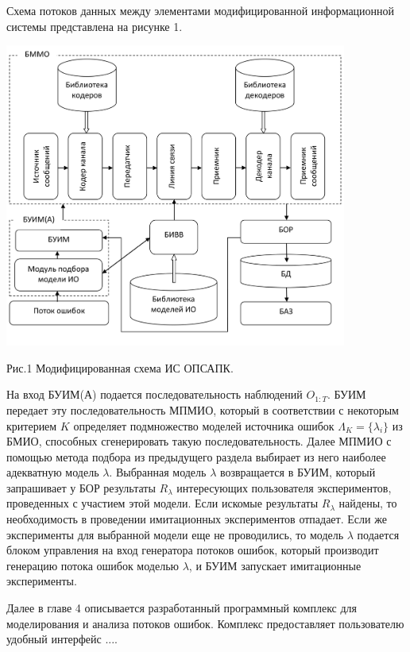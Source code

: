 \documentclass[twoside,12pt]{article}
\begin{document}
Схема потоков данных между элементами модифицированной информационной системы представлена на рисунке 1.
\begin{center}\label{fig:chapt4_isopsapk2}%
\includegraphics[height=100mm]{isopsapk_mod.jpg}

Рис.1 Модифицированная схема ИС ОПСАПК.
\end{center}

На вход БУИМ(А) подается последовательность наблюдений $O_{1:T}$. БУИМ передает эту последовательность МПМИО, который в соответствии с некоторым критерием $K$ определяет подмножество моделей источника ошибок $\Lambda_K=\{\lambda_i\}$ из БМИО, способных сгенерировать такую последовательность. Далее МПМИО с помощью метода подбора из предыдущего раздела выбирает из него наиболее адекватную модель $\lambda$.
Выбранная модель $\lambda$ возвращается в БУИМ, который запрашивает у БОР результаты $R_\lambda$ интересующих пользователя экспериментов, проведенных с участием этой модели. Если искомые результаты $R_\lambda$ найдены, то необходимость в проведении имитационных экспериментов отпадает. Если же эксперименты для выбранной модели еще не проводились, то модель $\lambda$ подается блоком управления на вход генератора потоков ошибок, который производит генерацию потока ошибок моделью $\lambda$, и БУИМ запускает имитационные эксперименты.

Далее в главе 4 описывается разработанный программный комплекс для моделирования и анализа потоков ошибок. Комплекс предоставляет пользователю удобный интерфейс ....
\end{document}
